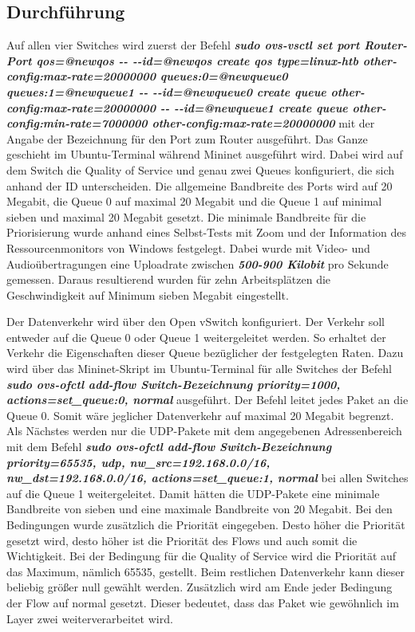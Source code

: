 \documentclass[fontsize=12pt,paper=a4,open=any,parskip=half,
  twoside=false,toc=listof,toc=bibliography,fleqn,leqno,
  captions=nooneline,captions=tableabove,british]{scrbook}
\begin{document}
\subsection{Durchführung}
Auf allen vier Switches wird zuerst der Befehl \textit{\textbf{sudo ovs\hyp{}vsctl set port Router\hyp{}Port qos=@newqos \hyp{}\hyp{} \hyp{}\hyp{}id=@newqos create qos type=linux\hyp{}htb other\hyp{}config:max\hyp{}rate=20000000 queues:0=@newqueue0 queues:1=@newqueue1 \hyp{}\hyp{} \hyp{}\hyp{}id=@newqueue0 create queue other\hyp{}config:max\hyp{}rate=20000000 \hyp{}\hyp{} \hyp{}\hyp{}id=\linebreak{}@newqueue1 create queue other\hyp{}config:min\hyp{}rate=7000000 other\hyp{}config:max\hyp{}rate=20000000}} mit der Angabe der Bezeichnung für den Port zum Router ausgeführt. Das Ganze geschieht im Ubuntu\hyp{}Terminal während Mininet ausgeführt wird. Dabei wird auf dem Switch die Quality of Service und genau zwei Queues konfiguriert, die sich anhand der ID unterscheiden. Die allgemeine Bandbreite des Ports wird auf 20 Megabit, die Queue 0 auf maximal 20 Megabit und die Queue 1 auf minimal sieben und maximal 20 Megabit gesetzt. Die minimale Bandbreite für die Priorisierung wurde anhand eines Selbst\hyp{}Tests mit Zoom und der Information des Ressourcenmonitors von Windows festgelegt. Dabei wurde mit Video\hyp{} und Audioübertragungen eine Uploadrate zwischen \textit{\textbf{500\hyp{}900 Kilobit}} pro Sekunde gemessen. Daraus resultierend wurden für zehn Arbeitsplätzen die Geschwindigkeit auf Minimum sieben Megabit eingestellt.\par
Der Datenverkehr wird über den Open vSwitch konfiguriert. Der Verkehr soll entweder auf die Queue 0 oder Queue 1 weitergeleitet werden. So erhaltet der Verkehr die Eigenschaften dieser Queue bezüglicher der festgelegten Raten. Dazu wird über das Mininet-Skript im Ubuntu-Terminal für alle Switches der Befehl \textit{\textbf{sudo ovs-ofctl add-flow Switch-Bezeichnung priority=1000, actions=set\_queue:0, normal}} ausgeführt. Der Befehl leitet jedes Paket an die Queue 0. Somit wäre jeglicher Datenverkehr auf maximal 20 Megabit begrenzt. Als Nächstes werden nur die UDP-Pakete mit dem angegebenen Adressenbereich mit dem Befehl \textit{\textbf{sudo ovs-ofctl add-flow Switch-Bezeichnung priority=65535, udp, nw\_src=192.168.0.0/16, nw\_dst=192.168.0.0/16, actions=set\_queue:1, normal}} bei allen Switches auf die Queue 1 weitergeleitet. Damit hätten die UDP-Pakete eine minimale Bandbreite von sieben und eine maximale Bandbreite von 20 Megabit. Bei den Bedingungen wurde zusätzlich die Priorität eingegeben. Desto höher die Priorität gesetzt wird, desto höher ist die Priorität des Flows und auch somit die Wichtigkeit. Bei der Bedingung für die Quality of Service wird die Priorität auf das Maximum, nämlich 65535, gestellt. Beim restlichen Datenverkehr kann dieser beliebig größer null gewählt werden. Zusätzlich wird am Ende jeder Bedingung der Flow auf normal gesetzt. Dieser bedeutet, dass das Paket wie gewöhnlich im Layer zwei weiterverarbeitet wird.
\end{document}
